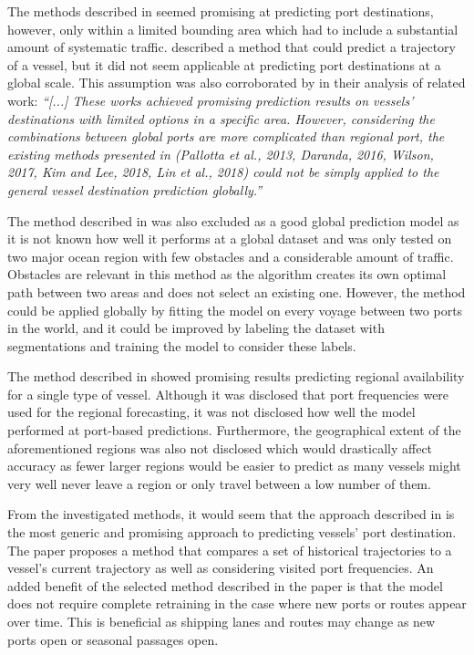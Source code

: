 The methods described in \cite{pallotta} seemed promising at predicting port destinations, however, only within a limited bounding area which had to include a substantial amount of systematic traffic. \cite{Daranda2016NeuralNA} described a method that could predict a trajectory of a vessel, but it did not seem applicable at predicting port destinations at a global scale. This assumption was also corroborated by \cite{ZHANG2020102729} in their analysis of related work: \textit{“[...] These works achieved promising prediction results on vessels’ destinations with limited options in a specific area. However, considering the combinations between global ports are more complicated than regional port, the existing methods presented in (Pallotta et al., 2013, Daranda, 2016, Wilson, 2017, Kim and Lee, 2018, Lin et al., 2018) could not be simply applied to the general vessel destination prediction globally.”}

The method described in \cite{Pelizzari2016GeneticAF} was also excluded as a good global prediction model as it is not known how well it performs at a global dataset and was only tested on two major ocean region with few obstacles and a considerable amount of traffic. Obstacles are relevant in this method as the algorithm creates its own optimal path between two areas and does not select an existing one. However, the method could be applied globally by fitting the model on every voyage between two ports in the world, and it could be improved by labeling the dataset with segmentations and training the model to consider these labels.

The method described in \cite{lechtenberg2019} showed promising results predicting regional availability for a single type of vessel. Although it was disclosed that port frequencies were used for the regional forecasting, it was not disclosed how well the model performed at port-based predictions. Furthermore, the geographical extent of the aforementioned regions was also not disclosed which would drastically affect accuracy as fewer larger regions would be easier to predict as many vessels might very well never leave a region or only travel between a low number of them.

From the investigated methods, it would seem that the approach described in \cite{ZHANG2020102729} is the most generic and promising approach to predicting vessels’ port destination. The paper proposes a method that compares a set of historical trajectories to a vessel’s current trajectory as well as considering visited port frequencies. An added benefit of the selected method described in the paper is that the model does not require complete retraining in the case where new ports or routes appear over time. This is beneficial as shipping lanes and routes may change as new ports open or seasonal passages open.

